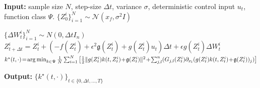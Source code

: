 \documentclass[letterpaper, 10 pt, conference]{ieeeconf}  %
\def\argmin{\mathop{\text{\rm arg\,min}}}
\newcommand{\ud}{\,\mathrm{d}}
\def\argmin{\mathop{\text{\rm arg\,min}}}
\begin{document}
\begin{algorithm}[bt]
\caption{Time-Reversal Control Synthesis} 
\begin{algorithmic}[1]
\STATE \textbf{Input:}  sample size $N$, step-size $\Delta t$, variance $\sigma$, deterministic control input $u_t$, function class $\Psi$.   
\STATE  $\{Z_0^i\}_{i=1}^N \sim \mathcal{N}(x_f, \sigma^2I)$

\STATE $\{\Delta  W^i_t\}_{i=1}^N\sim N(0,\Delta t I_n)$
	\STATE $ Z^{i}_{t+\Delta t} \!=\!  Z^i_{t}\!+\!(-f(Z^{i}_{t})\!+\!\epsilon^2\mathfrak g( Z^{i}_{t})+g(Z^{i}_{t})u_t)\Delta t  + \epsilon g(Z^{i}_{t})  \Delta  W^i_t$
\ENDFOR
\STATE $k^\star(t,\cdot)\!=\! \argmin_{k\in \Psi} \frac{1}{N}\sum_{i=1}^N \big[\frac{1}{2}\|g( Z^{i}_{t})k(t,Z^i_{t}) \!+\! \mathfrak g( Z^i_{t})\|^2 \!+\!  \sum_{j,l}^n(G_{j,l}(Z^i_{t})\partial_{x_l} (g(Z^{i}_{t})k(t,Z^i_{t})\!+\!\mathfrak g( Z^i_{t}))_j)\big]$

 \STATE \textbf{Output:}  $\{k^\star(t,\cdot)\}_{t\in \{0,\Delta t,\ldots,T\} }$
\end{algorithmic}
\label{alg:improved}
\end{algorithm}
\end{document}
